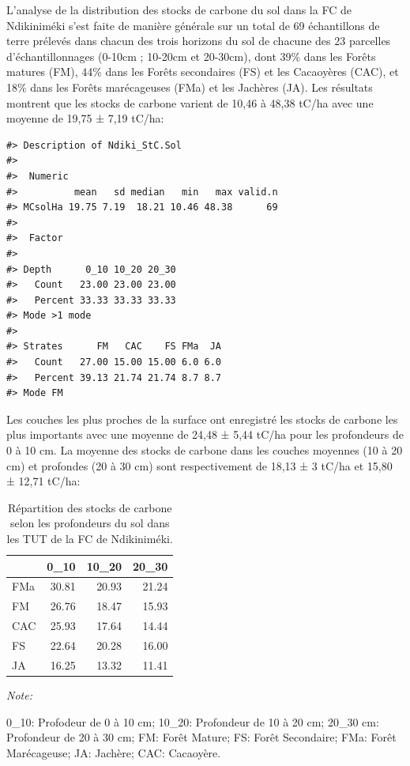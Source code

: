 \documentclass[
  12pt,
  a4paper,
  extrafontsizes,
  onecolumn,
  openright]{book}
\theoremstyle{definition}
\theoremstyle{definition}
\theoremstyle{definition}
\theoremstyle{definition}
\theoremstyle{remark}
\begin{document}
L'analyse de la distribution des stocks de carbone du sol dans la FC de Ndikiniméki s'est faite de manière générale sur un total de 69 échantillons de terre prélevés dans chacun des trois horizons du sol de chacune des 23 parcelles d'échantillonnages (0-10cm ; 10-20cm et 20-30cm), dont 39\% dans les Forêts matures (FM), 44\% dans les Forêts secondaires (FS) et les Cacaoyères (CAC), et 18\% dans les Forêts marécageuses (FMa) et les Jachères (JA). Les résultats montrent que les stocks de carbone varient de 10,46 à 48,38 tC/ha avec une moyenne de 19,75 ± 7,19 tC/ha:

\begin{verbatim}
#> Description of Ndiki_StC.Sol
#> 
#>  Numeric 
#>          mean   sd median   min   max valid.n
#> MCsolHa 19.75 7.19  18.21 10.46 48.38      69
#> 
#>  Factor 
#>          
#> Depth      0_10 10_20 20_30
#>   Count   23.00 23.00 23.00
#>   Percent 33.33 33.33 33.33
#> Mode >1 mode 
#>          
#> Strates      FM   CAC    FS FMa  JA
#>   Count   27.00 15.00 15.00 6.0 6.0
#>   Percent 39.13 21.74 21.74 8.7 8.7
#> Mode FM
\end{verbatim}

Les couches les plus proches de la surface ont enregistré les stocks de carbone les plus importants avec une moyenne de 24,48 ± 5,44 tC/ha pour les profondeurs de 0 à 10 cm. La moyenne des stocks de carbone dans les couches moyennes (10 à 20 cm) et profondes (20 à 30 cm) sont respectivement de 18,13 ± 3 tC/ha et 15,80 ± 12,71 tC/ha:

\begin{table}[H]
\centering
\caption{\label{tab:Descriptionsommairesol-Ndikinimeki3} Répartition des stocks de carbone selon les profondeurs du sol dans les TUT de la FC de Ndikiniméki.}
\centering
\begin{threeparttable}
\begin{tabular}[t]{lrrr}
\toprule
  & 0\_10 & 10\_20 & 20\_30\\
\midrule
FMa & 30.81 & 20.93 & 21.24\\
FM & 26.76 & 18.47 & 15.93\\
CAC & 25.93 & 17.64 & 14.44\\
FS & 22.64 & 20.28 & 16.00\\
JA & 16.25 & 13.32 & 11.41\\
\bottomrule
\end{tabular}
\begin{tablenotes}
\item \textit{Note: } 
\item 0\_10: Profodeur de 0 à 10 cm; 10\_20: Profondeur de 10 à 20 cm; 20\_30 cm: Profondeur de 20 à 30 cm; FM: Forêt Mature; FS: Forêt Secondaire; FMa: Forêt Marécageuse; JA: Jachère; CAC: Cacaoyère.
\end{tablenotes}
\end{threeparttable}
\end{table}
\end{document}
